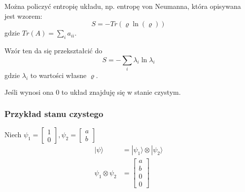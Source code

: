 \documentclass[11pt, a4paper, fleqn]{article}
\begin{document}
        Można policzyć entropię układu, np. entropę von Neumanna, która opisywana jest wzorem:
        \begin{equation}
            S = -Tr(\varrho\ln(\varrho))
        \end{equation}
        gdzie $Tr(A) = \sum_{i}a_{ii}$.

        Wzór ten da się przekształcić do
        \begin{equation}
            S = -\sum_{i}\lambda_i\ln\lambda_i
        \end{equation}
        gdzie $\lambda_i$ to wartości własne $\varrho$. 

        Jeśli wynosi ona 0 to układ znajduję się w stanie czystym.

        \subsubsection*{Przykład stanu czystego}
            \def\psia{
                \begin{bmatrix}
                    1\\
                    0
                \end{bmatrix}
            }
            \def\psib{
                \begin{bmatrix}
                    a\\
                    b
                \end{bmatrix}
            }
            \def\psio{
                \begin{bmatrix}
                    a\\
                    b\\
                    0\\
                    0
                \end{bmatrix}
            }
            Niech $\psi_1 = \psia, \psi_2 = \psib$
            \begin{equation}
                \begin{split}
                    |\psi\rangle &= |\psi_1\rangle \otimes |\psi_2\rangle\\                   
                    \psi_1 \otimes \psi_2 &= \psio
                \end{split}
            \end{equation}    
\end{document}
